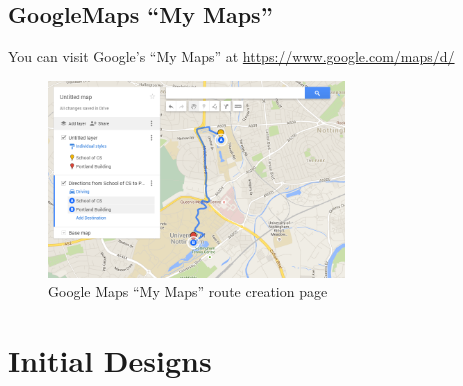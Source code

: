 \documentclass[a4paper,twoside,notitlepage,11pt]{article}
\begin{document}
\subsection{GoogleMaps ``My Maps''} 
You can visit Google's ``My Maps'' at \url{https://www.google.com/maps/d/}
\begin{figure}[!ht]
	\begin{center}
		\includegraphics[width=0.7\textwidth]{images/google_maps.png}
	\end{center}
	\vspace{-6mm}
	\caption{Google Maps ``My Maps'' route creation page}
\end{figure}

\section{Initial Designs}
\label{app-designs}
\end{document}
